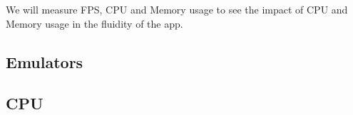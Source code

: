 We will measure FPS, CPU and Memory usage to see the impact of CPU and Memory usage in the fluidity of the app.
\newline

\subsection{Emulators}

\subsection{CPU}


